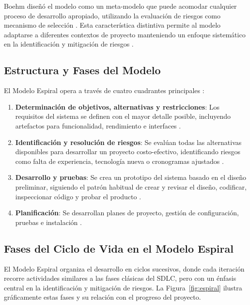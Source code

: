 \documentclass[conference]{IEEEtran}
\begin{document}
Boehm diseñó el modelo como un meta-modelo que puede acomodar cualquier proceso de desarrollo apropiado, utilizando la evaluación de riesgos como mecanismo de selección \cite{semantic_scholar_spiral}. Esta característica distintiva permite al modelo adaptarse a diferentes contextos de proyecto manteniendo un enfoque sistemático en la identificación y mitigación de riesgos \cite{boehm1988spiral}.

\subsection{Estructura y Fases del Modelo}

El Modelo Espiral opera a través de cuatro cuadrantes principales \cite{ultimate_sdlc_spiral}:

\begin{enumerate}
\item \textbf{Determinación de objetivos, alternativas y restricciones}: Los requisitos del sistema se definen con el mayor detalle posible, incluyendo artefactos para funcionalidad, rendimiento e interfaces \cite{ultimate_sdlc_spiral}.

\item \textbf{Identificación y resolución de riesgos}: Se evalúan todas las alternativas disponibles para desarrollar un proyecto costo-efectivo, identificando riesgos como falta de experiencia, tecnología nueva o cronogramas ajustados \cite{gordon_case_study}.

\item \textbf{Desarrollo y pruebas}: Se crea un prototipo del sistema basado en el diseño preliminar, siguiendo el patrón habitual de crear y revisar el diseño, codificar, inspeccionar código y probar el producto \cite{ultimate_sdlc_spiral}.

\item \textbf{Planificación}: Se desarrollan planes de proyecto, gestión de configuración, pruebas e instalación \cite{gordon_case_study}.
\end{enumerate}

\subsection{Fases del Ciclo de Vida en el Modelo Espiral}

El Modelo Espiral organiza el desarrollo en ciclos sucesivos, donde cada iteración recorre actividades similares a las fases clásicas del SDLC, pero con un énfasis central en la identificación y mitigación de riesgos. La Figura~\ref{fig:espiral} ilustra gráficamente estas fases y su relación con el progreso del proyecto.
\end{document}
